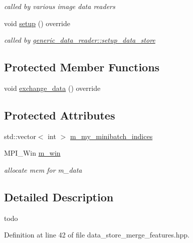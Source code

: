 \begin{DoxyCompactItemize}
\begin{DoxyCompactList}\small\item\em called by various image data readers \end{DoxyCompactList}\item 
void \hyperlink{classlbann_1_1data__store__merge__features_aecb1fbbbc0c0ee9647cf178487eb2c02}{setup} () override
\begin{DoxyCompactList}\small\item\em called by \hyperlink{classlbann_1_1generic__data__reader_a8b2a09d38512fc11f1b9d572c89100a7}{generic\+\_\+data\+\_\+reader\+::setup\+\_\+data\+\_\+store} \end{DoxyCompactList}\end{DoxyCompactItemize}
\subsection*{Protected Member Functions}
\begin{DoxyCompactItemize}
\item 
void \hyperlink{classlbann_1_1data__store__merge__features_a6a55e3959727a104b4470ba51e0988c3}{exchange\+\_\+data} () override
\end{DoxyCompactItemize}
\subsection*{Protected Attributes}
\begin{DoxyCompactItemize}
\item 
std\+::vector$<$ int $>$ \hyperlink{classlbann_1_1data__store__merge__features_adb33a14f6b49ff16a217bcb30d3f0e1b}{m\+\_\+my\+\_\+minibatch\+\_\+indices}
\item 
M\+P\+I\+\_\+\+Win \hyperlink{classlbann_1_1data__store__merge__features_a98f2c892955666c136ea4bb8aeba5e2b}{m\+\_\+win}
\begin{DoxyCompactList}\small\item\em allocate mem for m\+\_\+data \end{DoxyCompactList}\end{DoxyCompactItemize}


\subsection{Detailed Description}
todo 

Definition at line 42 of file data\+\_\+store\+\_\+merge\+\_\+features.\+hpp.




